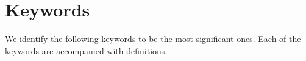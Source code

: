 \documentclass[12pt]{article}
\begin{document}


\section{Keywords}
\label{keywords}
We identify the following keywords to be the most significant ones.  Each of the keywords 
are accompanied with definitions. 
\end{document}
